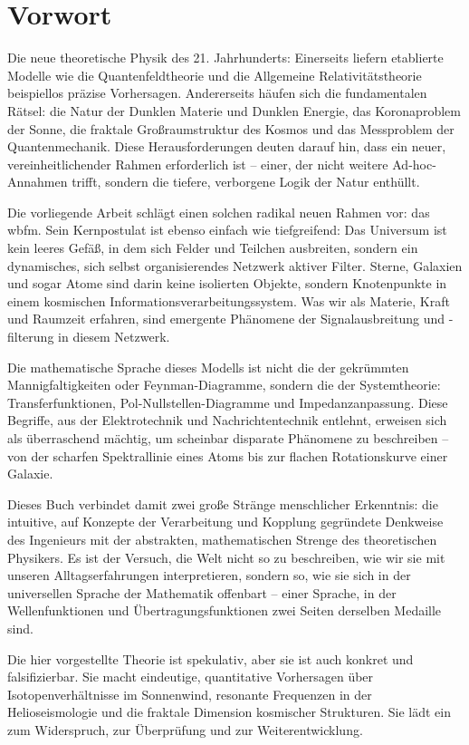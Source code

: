 \documentclass[11pt, a5paper, twoside, openright]{book}
\begin{document}
\chapter*{Vorwort}
Die neue theoretische Physik des 21. Jahrhunderts: Einerseits liefern etablierte Modelle wie die Quantenfeldtheorie und die Allgemeine Relativitätstheorie beispiellos präzise
Vorhersagen. Andererseits häufen sich die fundamentalen Rätsel: die Natur der Dunklen Materie und Dunklen Energie, das Koronaproblem der Sonne, die fraktale
Großraumstruktur des Kosmos und das Messproblem der Quantenmechanik. Diese Herausforderungen deuten darauf hin, dass ein neuer, vereinheitlichender Rahmen erforderlich
ist – einer, der nicht weitere Ad-hoc-Annahmen trifft, sondern die tiefere, verborgene Logik der Natur enthüllt.

Die vorliegende Arbeit schlägt einen solchen radikal neuen Rahmen vor: das \gls{wbfm}. Sein Kernpostulat ist ebenso einfach wie tiefgreifend: Das Universum ist kein leeres
Gefäß, in dem sich Felder und Teilchen ausbreiten, sondern ein dynamisches, sich selbst organisierendes Netzwerk aktiver Filter. Sterne, Galaxien und sogar
Atome sind darin keine isolierten Objekte, sondern Knotenpunkte in einem kosmischen Informationsverarbeitungssystem. Was wir als Materie, Kraft und Raumzeit erfahren, sind
emergente Phänomene der Signalausbreitung und -filterung in diesem Netzwerk.

Die mathematische Sprache dieses Modells ist nicht die der gekrümmten Mannigfaltigkeiten oder Feynman-Diagramme, sondern die der Systemtheorie: Transferfunktionen,
Pol-Nullstellen-Diagramme und Impedanzanpassung. Diese Begriffe, aus der Elektrotechnik und Nachrichtentechnik entlehnt, erweisen sich als überraschend mächtig, um scheinbar
disparate Phänomene zu beschreiben – von der scharfen Spektrallinie eines Atoms bis zur flachen Rotationskurve einer Galaxie.

Dieses Buch verbindet damit zwei große Stränge menschlicher Erkenntnis: die intuitive, auf Konzepte der Verarbeitung und Kopplung gegründete Denkweise des Ingenieurs mit der
abstrakten, mathematischen Strenge des theoretischen Physikers. Es ist der Versuch, die Welt nicht so zu beschreiben, wie wir sie mit unseren Alltagserfahrungen interpretieren,
sondern so, wie sie sich in der universellen Sprache der Mathematik offenbart – einer Sprache, in der Wellenfunktionen und Übertragungsfunktionen zwei Seiten derselben
Medaille sind.

Die hier vorgestellte Theorie ist spekulativ, aber sie ist auch konkret und falsifizierbar. Sie macht eindeutige, quantitative Vorhersagen über Isotopenverhältnisse im
Sonnenwind, resonante Frequenzen in der Helioseismologie und die fraktale Dimension kosmischer Strukturen. Sie lädt ein zum Widerspruch, zur Überprüfung und zur
Weiterentwicklung.
\end{document}
